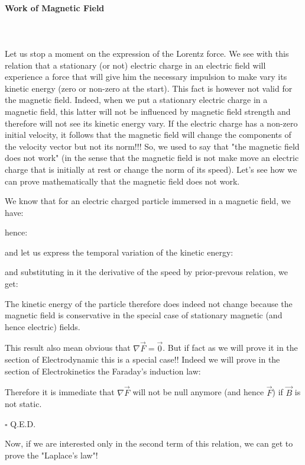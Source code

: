 	\paragraph{Work of Magnetic Field}\mbox{}\\\\
	Let us stop a moment on the expression of the Lorentz force. We see with this relation that a stationary (or not) electric charge in an electric field will experience a force that will give him the necessary impulsion to make vary its kinetic energy (zero or non-zero at the start). This fact is however not valid for the magnetic field. Indeed, when we put a stationary electric charge in a magnetic field, this latter will not be influenced by magnetic field strength and therefore will not see its kinetic energy vary. If the electric charge has a non-zero initial velocity, it follows that the magnetic field will change the components of the velocity vector but not its norm!!! So, we used to say that "the magnetic field does not work" (in the sense that the magnetic field is not make move an electric charge that is initially at rest or change the norm of its speed).
	Let's see how we can prove mathematically that the magnetic field does not work.
	\begin{dem}
	We know that for an electric charged particle immersed in a magnetic field, we have:
	
	hence:
	
	and let us express the temporal variation of the kinetic energy:
	
	and substituting in it the derivative of the speed by prior-prevous relation, we get:
	
	The kinetic energy of the particle therefore does indeed not change because the magnetic field is conservative in the special case of stationary magnetic (and hence electric) fields.
	
	This result also mean obvious that $\nabla{\vec{F}}=\vec{0}$. But if fact as we will prove it in the section of Electrodynamic this is a special case!! Indeed we will prove in the section of Electrokinetics the Faraday's induction law:
	
	Therefore it is immediate that $\nabla{\vec{F}}$ will not be null anymore (and hence $\vec{F}$) if $\vec{B}$ is not static.
	\begin{flushright}
		$\square$  Q.E.D.
	\end{flushright}
	\end{dem}
	Now, if we are interested only in the second term of this relation, we can get to prove the "Laplace's law"!

